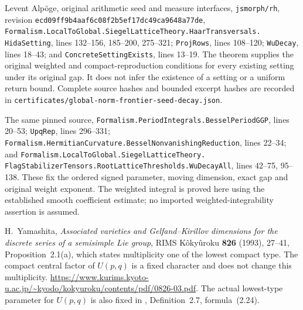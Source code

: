 Levent Alp\"oge, original arithmetic seed and measure interfaces,
\texttt{jsmorph/rh}, revision
\texttt{ecd09ff9b4aaf6c08f2b5ef17dc49ca9648a77de},
\texttt{Formalism.LocalToGlobal.SiegelLatticeTheory.HaarTransversals.}
\texttt{HidaSetting}, lines 132--156, 185--200, 275--321;
\texttt{ProjRows}, lines 108--120; \texttt{WuDecay}, lines 18--43;
and \texttt{ConcreteSettingExists}, lines 13--19.
The theorem supplies the original weighted and compact-reproduction
conditions for every existing setting under its original gap.
It does not infer the existence of a setting or a uniform return
bound.  Complete source hashes and bounded excerpt hashes are
recorded in \texttt{certificates/global-norm-frontier-seed-decay.json}.

The same pinned source,
\texttt{Formalism.PeriodIntegrals.BesselPeriodGGP}, lines 20--53;
\texttt{UpqRep}, lines 296--331;
\texttt{Formalism.HermitianCurvature.BesselNonvanishingReduction},
lines 22--34; and
\texttt{Formalism.LocalToGlobal.SiegelLatticeTheory.}
\texttt{FlagStabilizerTensors.RootLatticeThresholds.WuDecayAll},
lines 42--75, 95--138.
These fix the ordered signed parameter, moving dimension, exact
gap and original weight exponent.  The weighted integral is
proved here using the established smooth coefficient estimate;
no imported weighted-integrability assertion is assumed.

H.~Yamashita, \emph{Associated varieties and Gelfand--Kirillov
dimensions for the discrete series of a semisimple Lie group},
RIMS K\^oky\^uroku \textbf{826} (1993), 27--41,
Proposition~2.1(a), which states multiplicity one of the lowest
compact type.  The compact central factor of $U(p,q)$ is a
fixed character and does not change this multiplicity.
\url{https://www.kurims.kyoto-u.ac.jp/~kyodo/kokyuroku/contents/pdf/0826-03.pdf}.
The actual lowest-type parameter for $U(p,q)$ is also fixed in
\cite{pieri-family-hks}, Definition~2.7, formula~(2.24).
